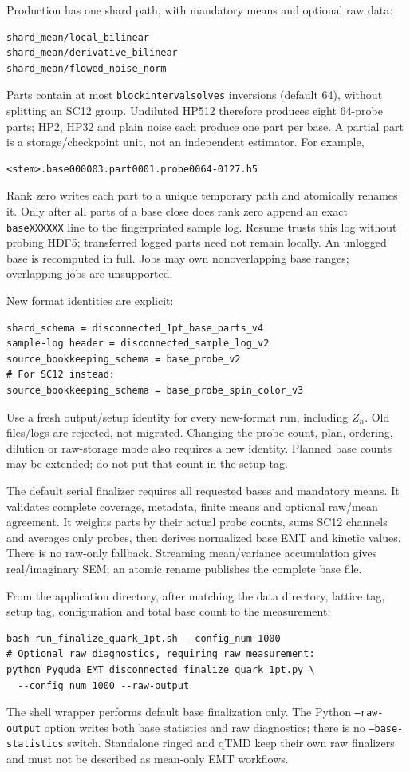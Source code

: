 \documentclass[11pt,a4paper]{article}
\newcommand{\code}[1]{\texttt{\begingroup\def\_{\textunderscore\allowbreak}#1\endgroup}}
\begin{document}
Production has one shard path, with mandatory means and optional raw data:
\begin{verbatim}
shard_mean/local_bilinear
shard_mean/derivative_bilinear
shard_mean/flowed_noise_norm
\end{verbatim}
Parts contain at most \code{block\_interval\_solves} inversions (default 64),
without splitting an SC12 group. Undiluted HP512 therefore produces eight
64-probe parts; HP2, HP32 and plain noise each produce one part per base.
A partial part is a storage/checkpoint unit, not an independent estimator.
For example,
\begin{verbatim}
<stem>.base000003.part0001.probe0064-0127.h5
\end{verbatim}
Rank zero writes each part to a unique temporary path and atomically renames
it. Only after all parts of a base close does rank zero append an exact
\code{baseXXXXXX} line to the fingerprinted sample log. Resume trusts this
log without probing HDF5; transferred logged parts need not remain locally.
An unlogged base is recomputed in full. Jobs may own nonoverlapping base ranges;
overlapping jobs are unsupported.

New format identities are explicit:
\begin{verbatim}
shard_schema = disconnected_1pt_base_parts_v4
sample-log header = disconnected_sample_log_v2
source_bookkeeping_schema = base_probe_v2
# For SC12 instead:
source_bookkeeping_schema = base_probe_spin_color_v3
\end{verbatim}
Use a fresh output/setup identity for every new-format run, including \(Z_n\).
Old files/logs are rejected, not migrated. Changing the probe count, plan,
ordering, dilution or raw-storage mode also requires a new identity. Planned
base counts may be extended; do not put that count in the setup tag.

The default serial finalizer requires all requested bases and mandatory means.
It validates complete coverage, metadata, finite means and optional raw/mean
agreement. It weights parts by their actual probe counts, sums SC12 channels
and averages only probes, then derives normalized base EMT and kinetic values.
There is no raw-only fallback. Streaming mean/variance accumulation gives
real/imaginary SEM; an atomic rename publishes the complete base file.

From the application directory, after matching the data directory, lattice tag,
setup tag, configuration and total base count to the measurement:
\begin{verbatim}
bash run_finalize_quark_1pt.sh --config_num 1000
# Optional raw diagnostics, requiring raw measurement:
python Pyquda_EMT_disconnected_finalize_quark_1pt.py \
  --config_num 1000 --raw-output
\end{verbatim}
The shell wrapper performs default base finalization only. The Python
\code{--raw-output} option writes both base statistics and raw diagnostics;
there is no \code{--base-statistics} switch. Standalone ringed and qTMD keep
their own raw finalizers and must not be described as mean-only EMT workflows.
\end{document}
